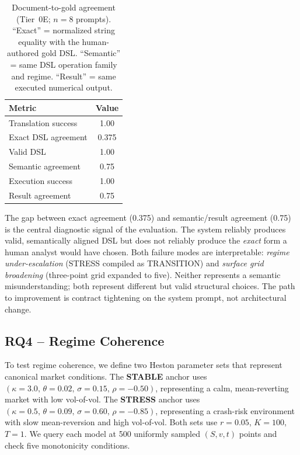 \documentclass[11pt,a4paper]{article}
\begin{document}
\begin{table}[ht]
\centering
\caption{Document-to-gold agreement (Tier~0E; $n=8$ prompts). ``Exact'' = normalized
string equality with the human-authored gold DSL. ``Semantic'' = same DSL operation
family and regime. ``Result'' = same executed numerical output.}
\begin{tabular}{@{}lc@{}}
\toprule
Metric & Value \\ \midrule
Translation success & 1.00 \\
Exact DSL agreement & 0.375 \\
Valid DSL & 1.00 \\
Semantic agreement & 0.75 \\
Execution success & 1.00 \\
Result agreement & 0.75 \\ \bottomrule
\end{tabular}
\label{tab:gold}
\end{table}

The gap between exact agreement (0.375) and semantic/result agreement (0.75) is the
central diagnostic signal of the evaluation. The system reliably produces valid,
semantically aligned DSL but does not reliably produce the \emph{exact} form a human
analyst would have chosen. Both failure modes are interpretable: \emph{regime
under-escalation} (STRESS compiled as TRANSITION) and \emph{surface grid broadening}
(three-point grid expanded to five). Neither represents a semantic misunderstanding;
both represent different but valid structural choices. The path to improvement is
contract tightening on the system prompt, not architectural change.

\subsection{RQ4 -- Regime Coherence}
\label{sec:rq4}

To test regime coherence, we define two Heston parameter sets that represent canonical
market conditions. The \textbf{STABLE} anchor uses $(\kappa{=}3.0,\,\theta{=}0.02,\,
\sigma{=}0.15,\,\rho{=}{-}0.50)$, representing a calm, mean-reverting market with low
vol-of-vol. The \textbf{STRESS} anchor uses $(\kappa{=}0.5,\,\theta{=}0.09,\,
\sigma{=}0.60,\,\rho{=}{-}0.85)$, representing a crash-risk environment with slow
mean-reversion and high vol-of-vol. Both sets use $r{=}0.05$, $K{=}100$, $T{=}1$. We
query each model at 500 uniformly sampled $(S,v,t)$ points and check five monotonicity
conditions.
\end{document}
